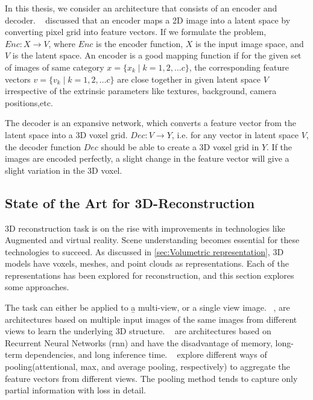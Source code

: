 In this thesis, we consider an architecture that consists of an encoder and decoder.
~\cite{Han2021ImageBased3O} discussed that an encoder maps a 2D image into a latent space by converting pixel grid into feature vectors.
If we formulate the problem, $Enc: X \to V$, where $Enc$ is the encoder function, $X$ is the input image space, and $V$ is the latent space.
An encoder is a good mapping function if for the given set of images of same category $x = \{x_k \mid k = 1,2,\dots c\}$, the corresponding feature vectors $v = \{v_k \mid k = 1,2,\dots c\}$ are close together in given latent space $V$
irrespective of the extrinsic parameters like textures, background, camera positions,etc.

The decoder is an expansive network, which converts a feature vector from the latent space into a 3D voxel grid.
$Dec: V \to Y$, i.e. for any vector in latent space $V$, the decoder function \textbf{$Dec$} should be able to create a 3D voxel grid in $Y$.
If the images are encoded perfectly, a slight change in the feature vector will give a slight variation in the 3D voxel.

\subsection{State of the Art for 3D-Reconstruction}\label{sec:state_of_the_art}

3D reconstruction task is on the rise with improvements in technologies like Augmented and virtual reality.
Scene understanding becomes essential for these technologies to succeed.
As discussed in \autoref{sec:Volumetric representation}, 3D models have voxels, meshes, and point clouds as representations.
Each of the representations has been explored for reconstruction, and this section explores some approaches.

The task can either be applied to \b{a multi-view, or a single view image}.
~\cite{Kar2017, choy20163d, Yang_2019, Huang2018, Paschalidou2018RayNetLV, Xie_2019, Xie_2020},
are architectures based on multiple input images of the same images from different views to learn the underlying 3D structure.
~\cite{Kar2017, choy20163d} are architectures based on Recurrent Neural Networks (\gls{rnn}) and have the disadvantage of memory,
long-term dependencies, and long inference time.
~\cite{Yang_2019, Huang2018, Paschalidou2018RayNetLV} explore different ways of pooling(attentional, max, and average pooling, respectively)
to aggregate the feature vectors from different views.
The pooling method tends to capture only partial information with loss in detail.

